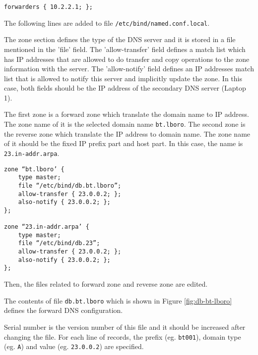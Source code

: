 \begin{lstlisting}
forwarders { 10.2.2.1; };
\end{lstlisting}



The following lines are added to file \texttt{/etc/bind/named.conf.local}.

The zone section defines the type of the DNS server and it is stored in a file mentioned in the 'file' field. 
The 'allow-transfer' field defines a match list which has IP addresses that are allowed to do transfer and copy operations to the zone information with the server. 
The 'allow-notify' field defines an IP addresses match list that is allowed to notify this server and implicitly update the zone.
In this case, both fields should be the IP address of the secondary DNS server (Laptop 1).

The first zone is a forward zone which translate the domain name to IP address. The zone name of it is the selected domain name \texttt{bt.lboro}. 
The second zone is the reverse zone which translate the IP address to domain name. The zone name of it should be the fixed IP prefix part and host part. In this case, the name is \texttt{23.in-addr.arpa}.


\begin{lstlisting}
zone “bt.lboro’ {
	type master;
	file “/etc/bind/db.bt.lboro”;
	allow-transfer { 23.0.0.2; };
	also-notify { 23.0.0.2; };
};

zone “23.in-addr.arpa’ {
	type master;
	file “/etc/bind/db.23”;
	allow-transfer { 23.0.0.2; };
	also-notify { 23.0.0.2; };
};
\end{lstlisting}

Then, the files related to forward zone and reverse zone are edited. 

The contents of file \texttt{db.bt.lboro} which is shown in Figure \ref{fig:db-bt-lboro} defines the forward DNS configuration.

\begin{figure*}[ht!]
\caption{Contents of Forward DNS Configuration File Named \texttt{db.bt.lboro}}
\label{fig:db-bt-lboro}
\end{figure*}


Serial number is the version number of this file and it should be increased after changing the file. 
For each line of records, the prefix (eg. \texttt{bt001}), domain type (eg. \texttt{A}) and value (eg. \texttt{23.0.0.2}) are specified.


\begin{figure*}[ht!]
\caption{Contents of Reverse DNS Configuration File Named \texttt{db.23}}
\label{fig:db-23}
\end{figure*}

